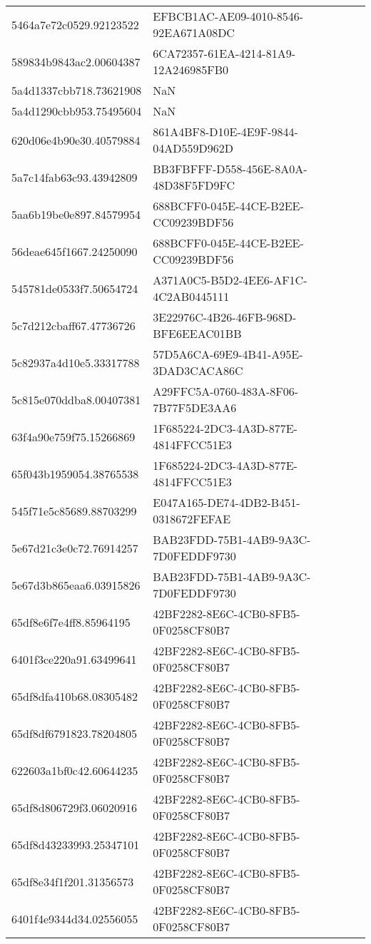 \begin{tabular}{ll}
5464a7e72c0529.92123522 & EFBCB1AC-AE09-4010-8546-92EA671A08DC \\
589834b9843ac2.00604387 & 6CA72357-61EA-4214-81A9-12A246985FB0 \\
5a4d1337cbb718.73621908 & NaN \\
5a4d1290cbb953.75495604 & NaN \\
620d06e4b90e30.40579884 & 861A4BF8-D10E-4E9F-9844-04AD559D962D \\
5a7c14fab63c93.43942809 & BB3FBFFF-D558-456E-8A0A-48D38F5FD9FC \\
5aa6b19be0e897.84579954 & 688BCFF0-045E-44CE-B2EE-CC09239BDF56 \\
56deae645f1667.24250090 & 688BCFF0-045E-44CE-B2EE-CC09239BDF56 \\
545781de0533f7.50654724 & A371A0C5-B5D2-4EE6-AF1C-4C2AB0445111 \\
5c7d212cbaff67.47736726 & 3E22976C-4B26-46FB-968D-BFE6EEAC01BB \\
5c82937a4d10e5.33317788 & 57D5A6CA-69E9-4B41-A95E-3DAD3CACA86C \\
5c815e070ddba8.00407381 & A29FFC5A-0760-483A-8F06-7B77F5DE3AA6 \\
63f4a90e759f75.15266869 & 1F685224-2DC3-4A3D-877E-4814FFCC51E3 \\
65f043b1959054.38765538 & 1F685224-2DC3-4A3D-877E-4814FFCC51E3 \\
545f71e5c85689.88703299 & E047A165-DE74-4DB2-B451-0318672FEFAE \\
5e67d21c3e0c72.76914257 & BAB23FDD-75B1-4AB9-9A3C-7D0FEDDF9730 \\
5e67d3b865eaa6.03915826 & BAB23FDD-75B1-4AB9-9A3C-7D0FEDDF9730 \\
65df8e6f7e4ff8.85964195 & 42BF2282-8E6C-4CB0-8FB5-0F0258CF80B7 \\
6401f3ce220a91.63499641 & 42BF2282-8E6C-4CB0-8FB5-0F0258CF80B7 \\
65df8dfa410b68.08305482 & 42BF2282-8E6C-4CB0-8FB5-0F0258CF80B7 \\
65df8df6791823.78204805 & 42BF2282-8E6C-4CB0-8FB5-0F0258CF80B7 \\
622603a1bf0c42.60644235 & 42BF2282-8E6C-4CB0-8FB5-0F0258CF80B7 \\
65df8d806729f3.06020916 & 42BF2282-8E6C-4CB0-8FB5-0F0258CF80B7 \\
65df8d43233993.25347101 & 42BF2282-8E6C-4CB0-8FB5-0F0258CF80B7 \\
65df8e34f1f201.31356573 & 42BF2282-8E6C-4CB0-8FB5-0F0258CF80B7 \\
6401f4e9344d34.02556055 & 42BF2282-8E6C-4CB0-8FB5-0F0258CF80B7 \\

\end{tabular}

